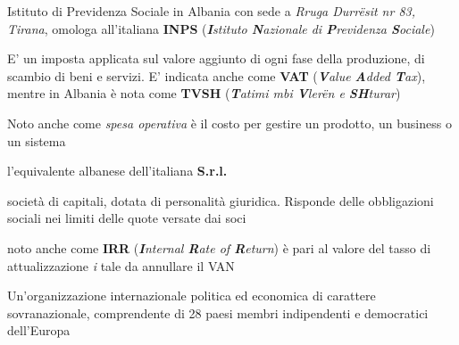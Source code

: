 \begin{acronym}
\begin{multicols}{2}
		   {\newline \small Istituto di Previdenza Sociale in Albania con sede a \textit{Rruga Durr\"esit nr 83, Tirana}\cite{issh_albania}, omologa all'italiana \textbf{INPS} (\textit{\textbf{I}stituto \textbf{N}azionale di \textbf{P}revidenza \textbf{S}ociale})\cite{inps_italia}\par}

		   {\newline \small E' un imposta applicata sul valore aggiunto di ogni fase della produzione, di scambio di beni e servizi. E' indicata anche come \textbf{VAT} (\textit{\textbf{V}alue \textbf{A}dded \textbf{T}ax}), mentre in Albania è nota come \textbf{TVSH} (\textit{\textbf{T}atimi mbi \textbf{V}ler\"en e \textbf{SH}turar}) \par}

		   {\newline \small Noto anche come \textit{spesa operativa} è il costo per gestire un prodotto, un business o un sistema \par}

		   {\newline \small l'equivalente albanese dell'italiana \textbf{\ac{S.r.l.}}\par}

		   {\newline \small società di capitali, dotata di personalità giuridica. Risponde delle obbligazioni sociali nei limiti delle quote versate dai soci\par}

		   {\newline \small noto anche come \textbf{IRR} (\textit{\textbf{I}nternal \textbf{R}ate of \textbf{R}eturn}) è pari al valore del tasso di attualizzazione \textit{i} tale da annullare il \ac{VAN} \par}		   

		   {\newline \small Un'organizzazione internazionale politica ed economica di carattere sovranazionale, comprendente di 28 paesi membri indipendenti e democratici dell'Europa\cite{paesiUE} \par}


\end{multicols}
\end{acronym}
